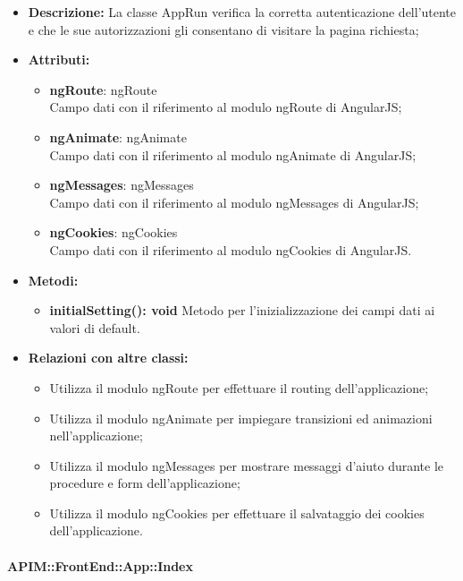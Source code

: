 \begin{itemize}
	\item \textbf{Descrizione:} La classe AppRun verifica la corretta autenticazione dell'utente e che le sue autorizzazioni gli consentano di visitare la pagina richiesta;
	\item \textbf{Attributi:}
		\begin{itemize}
			\item \textbf{ngRoute}: ngRoute\\
			Campo dati con il riferimento al modulo ngRoute di AngularJS;
			\item \textbf{ngAnimate}: ngAnimate\\
			Campo dati con il riferimento al modulo ngAnimate di AngularJS;
			\item \textbf{ngMessages}: ngMessages\\
			Campo dati con il riferimento al modulo ngMessages di AngularJS;
			\item \textbf{ngCookies}: ngCookies\\
			Campo dati con il riferimento al modulo ngCookies di AngularJS.
		\end{itemize}
	\item \textbf{Metodi:}
		\begin{itemize}
			\item \textbf{initialSetting(): void}
			Metodo per l'inizializzazione dei campi dati ai valori di default.
		\end{itemize}
	\item \textbf{Relazioni con altre classi:}
	\begin{itemize}
		\item Utilizza il modulo ngRoute per effettuare il routing dell'applicazione;
		\item Utilizza il modulo ngAnimate per impiegare transizioni ed animazioni nell'applicazione;
		\item Utilizza il modulo ngMessages per mostrare messaggi d'aiuto durante le procedure e form dell'applicazione;
		\item Utilizza il modulo ngCookies per effettuare il salvataggio dei cookies dell'applicazione.
	\end{itemize}
\end{itemize}

\paragraph{APIM::FrontEnd::App::Index}

